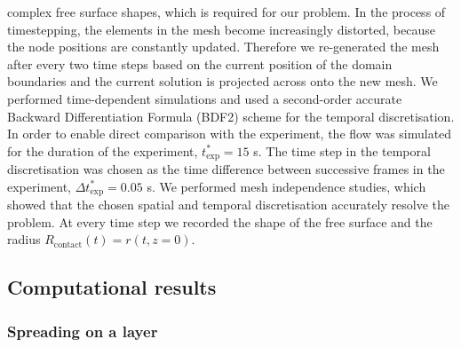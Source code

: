 \documentclass[aip,graphicx]{revtex4-1}
\newcommand{\sym}[1]{\text{#1}} \newcommand{\dif}{\mathrm{d}}
\begin{document}
complex free surface shapes, which is required for our problem.  In
the process of timestepping, the elements in the mesh become
increasingly distorted, because the node positions are constantly
updated.  Therefore we re-generated the mesh after every two time
steps based on the current position of the domain boundaries and the
current solution is projected across onto the new mesh.  We performed
time-dependent simulations and used a second-order accurate Backward
Differentiation Formula (BDF2) scheme \cite{sani2000incompressible}
for the temporal discretisation.  In order to enable direct comparison
with the experiment, the flow was simulated for the duration of the
experiment, $t^*_{\sym{exp}}=15$ s.  The time step in the temporal
discretisation was chosen as the time difference between successive
frames in the experiment, $\Delta t^*_{\sym{exp}} = 0.05$ s.  We
performed mesh independence studies, which showed that the chosen
spatial and temporal discretisation accurately resolve the problem.
At every time step we recorded the shape of the free surface and the
radius $R_{\sym{contact}}(t)=r(t,z=0)$.

\subsection{Computational results}

\subsubsection{Spreading on a layer}
\label{sec:comp_spreading_on_layer}
\end{document}
